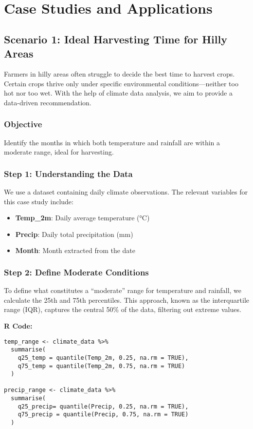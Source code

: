 \chapter{Case Studies and Applications}

\section*{Scenario 1: Ideal Harvesting Time for Hilly Areas}

Farmers in hilly areas often struggle to decide the best time to harvest crops. Certain crops thrive only under specific environmental conditions—neither too hot nor too wet. With the help of climate data analysis, we aim to provide a data-driven recommendation.

\subsection*{Objective}
Identify the months in which both temperature and rainfall are within a moderate range, ideal for harvesting.

\subsection*{Step 1: Understanding the Data}
We use a dataset containing daily climate observations. The relevant variables for this case study include:
\begin{itemize}
  \item \textbf{Temp\_2m}: Daily average temperature (°C)
  \item \textbf{Precip}: Daily total precipitation (mm)
  \item \textbf{Month}: Month extracted from the date
\end{itemize}

\subsection*{Step 2: Define Moderate Conditions}
To define what constitutes a ``moderate'' range for temperature and rainfall, we calculate the 25th and 75th percentiles. This approach, known as the interquartile range (IQR), captures the central 50\% of the data, filtering out extreme values.

\textbf{R Code:}
\begin{verbatim}
temp_range <- climate_data %>%
  summarise(
    q25_temp = quantile(Temp_2m, 0.25, na.rm = TRUE),
    q75_temp = quantile(Temp_2m, 0.75, na.rm = TRUE)
  )

precip_range <- climate_data %>%
  summarise(
    q25_precip= quantile(Precip, 0.25, na.rm = TRUE),
    q75_precip = quantile(Precip, 0.75, na.rm = TRUE)
  )
\end{verbatim}

